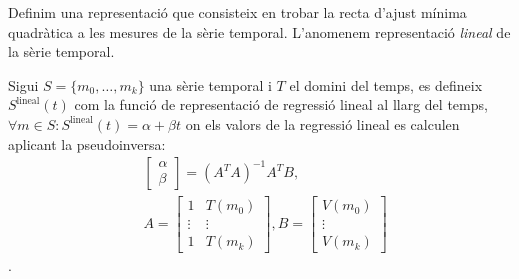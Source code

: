 Definim una representació que consisteix en trobar la recta d'ajust
mínima quadràtica a les mesures de la sèrie temporal. L'anomenem
representació \emph{lineal} de la sèrie temporal.
\begin{definition}
  Sigui $S=\{m_0,\ldots,m_k\}$ una sèrie temporal i $T$ el domini del
  temps, es defineix $S^\text{lineal}(t)$ com la funció de
  representació de regressió lineal al llarg del temps, $\forall m \in
  S: S^\text{lineal}(t) = \alpha + \beta t$ on els valors de la
  regressió lineal es calculen aplicant la pseudoinversa:
  \begin{align*}
    & 
    \left[\begin{array}{c}
        \alpha \\
        \beta
      \end{array}\right] 
    = (A^TA)^{-1}A^TB, \\
    & A=\left[\begin{array}{cc}
        1 & T(m_0) \\
        \vdots & \vdots \\
        1 & T(m_k)
      \end{array}\right],
    B=\left[\begin{array}{c}
        V(m_0) \\
        \vdots \\
        V(m_k)
      \end{array}\right]       
   \end{align*}.
\end{definition}


